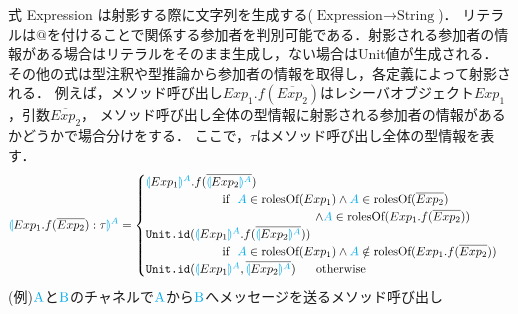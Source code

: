 \documentclass{thesis}
\newcommand{\projection}[2]{{\color{cyan}\llparenthesis}#1{\color{cyan}\rrparenthesis^#2}}
\newcommand{\mblue}[1]{\textbf{\textsf{\color{MidnightBlue}#1}}}
\newcommand{\cyan}[1]{\color{cyan}#1}
\begin{document}
式 Expression は射影する際に文字列を生成する($\text{Expression} \rightarrow \text{String}$)．
リテラルは$@$を付けることで関係する参加者を判別可能である．射影される参加者の情報がある場合はリテラルをそのまま生成し，ない場合はUnit値が生成される．
その他の式は型注釈や型推論から参加者の情報を取得し，各定義によって射影される．
例えば，メソッド呼び出し$Exp_1.f(\overline{Exp_2})$はレシーバオブジェクト$Exp_1$，引数$\overline{Exp_2}$，
メソッド呼び出し全体の型情報に射影される参加者の情報があるかどうかで場合分けをする．
ここで，$\tau$はメソッド呼び出し全体の型情報を表す．
\begin{alignat*}{2} 
  &\projection{Exp_1.f(\overline{Exp_2}):\tau}{A}=
  \begin{cases}
    \projection{Exp_1}{A}.f(\overline{\projection{Exp_2}{A}}) \\
    ~~~~~~~~~~~~~~~~~~~\text{if}~~ {\color{cyan}A} \in \text{rolesOf}(Exp_1) \wedge {\color{cyan}A} \in \text{rolesOf}(\overline{Exp_2})\\
    ~~~~~~~~~~~~~~~~~~~~~~~~~~~~~~~~~~~~~~~~~~ \wedge {\color{cyan}A} \in \text{rolesOf}(Exp_1.f(\overline{Exp_2}))\\
    \texttt{Unit.id}(\projection{Exp_1}{A}.f(\overline{\projection{Exp_2}{A}})) \\
    ~~~~~~~~~~~~~~~~~~~\text{if}~~ {\color{cyan}A} \in \text{rolesOf}(Exp_1) \wedge {\color{cyan}A} \notin \text{rolesOf}(Exp_1.f(\overline{Exp_2}))\\
    \texttt{Unit.id}(\projection{Exp_1}{A},\overline{\projection{Exp_2}{A}}) ~~~~~\text{otherwise}
  \end{cases}\\
\end{alignat*}
(例)$\cyan{\text{A}}$と$\cyan{\text{B}}$のチャネルで$\cyan{\text{A}}$から$\cyan{\text{B}}$へメッセージを送るメソッド呼び出し
\end{document}

